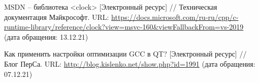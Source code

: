 
%

\begin{thebibliography}{3}	
	MSDN -- библиотека <clock> [Электронный ресурс] //
	Техническая документация Майкрософт.
	URL: \url{https://docs.microsoft.com/ru-ru/cpp/c-runtime-library/reference/clock?view=msvc-160&viewFallbackFrom=vs-2019}
	(дата обращения: 13.12.21)
	
	Как применить настройки оптимизации GCC в QT? [Электронный ресурс] //
	Блог ПерСа.
	URL:
	\url{http://blog.kislenko.net/show.php?id=1991}
	(дата обращения: 07.12.21)
\end{thebibliography}
